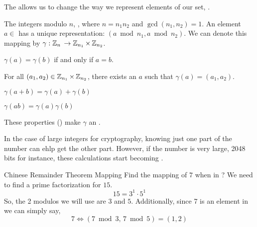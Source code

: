 \begin{definition}\label{def:Chinese_Remainder_Theorem}
  The \emph{} allows us to change the way we represent elements of our set, \TextIntsModN{}.
  
  The integers modulo $n$, \TextIntsModN{}, where $n = n_{1}n_{2}$ and $\gcd(n_{1}, n_{2}) = 1$.
  An element $a \in$ \TextIntsModN{} has a unique representation: $(a \bmod n_{1}, a \bmod n_{2})$.
  We can denote this mapping by $\gamma : \operatorname{\mathbb{Z}}_{n}{} \rightarrow \operatorname{\mathbb{Z}}_{n_{1}} \times \operatorname{\mathbb{Z}}_{n_{2}}$.
  \begin{propertylist}
  \item $\gamma(a) = \gamma(b)$ if and only if $a = b$. \label{prop:Chinese_Remainder_Theorem_Property-Equivalence}
  \item For all $(a_{1}, a_{2}) \in \operatorname{\mathbb{Z}}_{n_{1}} \times \operatorname{\mathbb{Z}}_{n_{2}}$, there exists an $a$ such that $\gamma(a) = (a_{1}, a_{2})$.
  \item $\gamma(a+b) = \gamma(a) + \gamma(b)$
  \item $\gamma(ab) = \gamma(a) \gamma(b)$ \label{prop:Chinese_Remainder_Theorem_Property-Multiplication}
  \end{propertylist}
  These properties () make $\gamma$ an \emph{}.

  \begin{remark}
    In the case of large integers for cryptography, knowing just one part of the number can ehlp get the other part.
    However, if the number is very large, 2048 bits for instance, these calculations start becoming .
  \end{remark}
\end{definition}

\begin{example}[]{Chinese Remainder Theorem Mapping}
  Find the mapping of $7$ when in ?
  \tcblower{}
  We need to find a prime factorization for $15$.
  \begin{equation*}
    15 = 3^{1} \cdot 5^{1}
  \end{equation*}
  So, the 2 modulos we will use are $3$ and $5$.
  Additionally, since 7 is an element in  we can simply say,
  \begin{equation*}
    7 \Leftrightarrow (7 \bmod 3,\, 7 \bmod 5) = (1, 2)
  \end{equation*}
\end{example}

